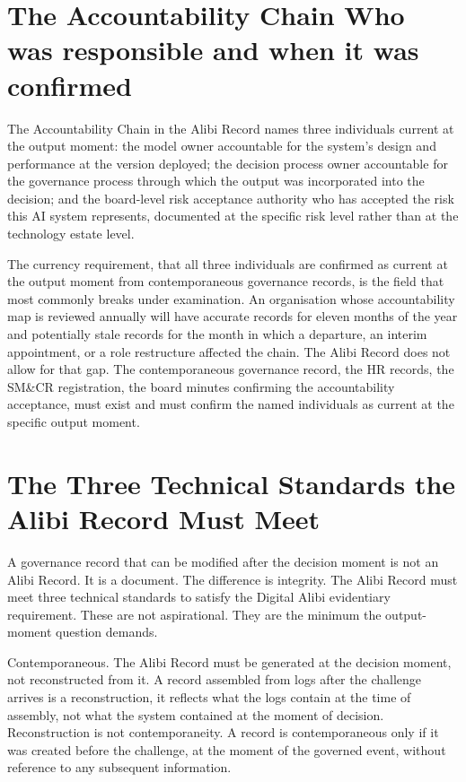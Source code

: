 \section{The Accountability Chain Who was responsible and when it was confirmed}

The Accountability Chain in the Alibi Record names three individuals current at the output moment: the model owner accountable for the system's design and performance at the version deployed; the decision process owner accountable for the governance process through which the output was incorporated into the decision; and the board-level risk acceptance authority who has accepted the risk this AI system represents, documented at the specific risk level rather than at the technology estate level.

The currency requirement, that all three individuals are confirmed as current at the output moment from contemporaneous governance records, is the field that most commonly breaks under examination. An organisation whose accountability map is reviewed annually will have accurate records for eleven months of the year and potentially stale records for the month in which a departure, an interim appointment, or a role restructure affected the chain. The Alibi Record does not allow for that gap. The contemporaneous governance record, the HR records, the SM\&CR registration, the board minutes confirming the accountability acceptance, must exist and must confirm the named individuals as current at the specific output moment.

\scenebreak

\section{The Three Technical Standards the Alibi Record Must Meet}

A governance record that can be modified after the decision moment is not an Alibi Record. It is a document. The difference is integrity. The Alibi Record must meet three technical standards to satisfy the Digital Alibi evidentiary requirement. These are not aspirational. They are the minimum the output-moment question demands.

Contemporaneous. The Alibi Record must be generated at the decision moment, not reconstructed from it. A record assembled from logs after the challenge arrives is a reconstruction, it reflects what the logs contain at the time of assembly, not what the system contained at the moment of decision. Reconstruction is not contemporaneity. A record is contemporaneous only if it was created before the challenge, at the moment of the governed event, without reference to any subsequent information.

